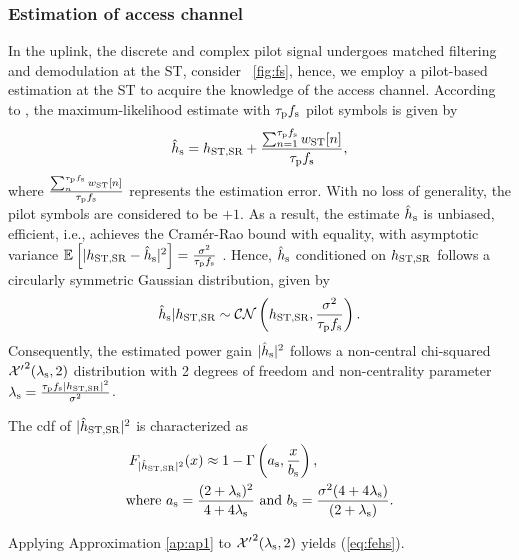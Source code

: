 \subsubsection{Estimation of access channel}
In the uplink, the discrete and complex pilot signal  undergoes matched filtering and demodulation at the ST, consider \figurename~\ref{fig:fs}, hence, we employ a pilot-based estimation at the ST to acquire the knowledge of the access channel. According to \cite{Gifford08}, the maximum-likelihood estimate with $\tau_{\text{p}}{f_{\text{s}}}$ pilot symbols is given by 
\begin{align}
\egs = \gs + \frac{\sum^{\Ks}_{n = 1} \nas[n]}{\Ks},
\label{eq:pilot_MLE}
\end{align}
where $\frac{\sum^{\tau_{\text{p}}{f_{\text{s}}}}_{n} w_{\text{ST}}[n]}{\tau_{\text{p}}{f_{\text{s}}}}$ represents the estimation error. With no loss of generality, the pilot symbols are considered to be $+1$.
As a result, the estimate $\hat{h}_{\text{s}}$ is unbiased, efficient, i.e., achieves the Cram\'er-Rao bound with equality, with asymptotic variance ${\mathbb E}_{}\left[ |h_{\text{ST,SR}} -\hat{h}_{\text{s}}|^2 \right] = \frac{\sigma^2}{\tau_{\text{p}}{f_{\text{s}}}}$ \cite{Gifford08}. Hence, $\hat{h}_{\text{s}}$ conditioned on $h_{\text{ST,SR}}$ follows a circularly symmetric Gaussian distribution, given by
\begin{align}
\egs|\gs \sim \mathcal{C} \mathcal{N}\left( \gs,\frac{\nps}{\Ks} \right).
\label{eq:ehs} 
\end{align}
Consequently,  the estimated power gain $|\hat{h}_{\text{s}}|^2$ follows a non-central chi-squared $\ncchi2(\ls, 2)$ distribution with 2 degrees of freedom and non-centrality parameter $\lambda_{\text{s}} = \frac{\tau_{\text{p}}{f_{\text{s}}} |h_{\text{ST,SR}}|^2}{\sigma^2}$. 
\begin{lemma} \label{lm:lm2}
\normalfont
The cdf of $|\hat{h}_{\text{ST,SR}}|^2$ is characterized as 
\begin{align}
\fgs(x) \approx 1 - \Gamma&\left(\as, \frac{x}{\bs}\right) \label{eq:fehs},\\ 
\text{where  } \as = \frac{(2 + \ls)^2}{4 + 4 \ls} &\text{ and } \bs = \frac{\nps (4 + 4 \ls)}{(2 + \ls)}. \label{eq:para_s} 
\end{align} 
\end{lemma}
\begin{IEEEproof}
Applying Approximation \ref{ap:ap1} to $\ncchi2(\ls, 2)$ yields (\ref{eq:fehs}). 
\end{IEEEproof}

